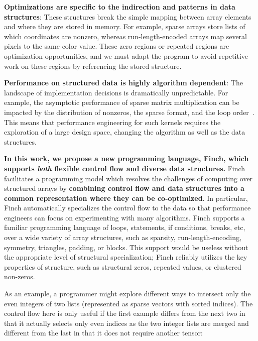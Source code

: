 \textbf{Optimizations are specific to the indirection and patterns in data structures}: 
%
These structures break the simple mapping between array elements and where they are stored in memory.
%
For example, sparse arrays store lists of which coordinates are nonzero, whereas run-length-encoded arrays map several pixels to the same color value. 
%
These zero regions or repeated regions are optimization opportunities, and we must adapt the program to avoid repetitive work on these regions by referencing the stored structure.

\textbf{Performance on structured data is highly algorithm dependent}: The landscape of implementation decisions is dramatically unpredictable. 
%
For example, the asymptotic performance of sparse matrix multiplication can be impacted by the distribution of nonzeros, the sparse format, and the loop order~\cite{ahrens2022autoscheduling, zhang2021gamma}. 
This means that performance engineering for such kernels requires the exploration of a large design space, changing the algorithm as well as the data structures.



\textbf{In this work, we propose a new programming language, Finch, which supports \textit{both} flexible control flow and diverse data structures.}
%
Finch facilitates a programming model which resolves the challenges of computing over structured arrays by \textbf{combining control flow and data structures into a common representation where they can be co-optimized}.
%
In particular, Finch automatically specializes the control flow to the data so that performance engineers can focus on experimenting with many algorithms.
%
Finch supports a familiar programming language of loops, statements, if conditions, breaks, etc, over a wide variety of array structures, such as sparsity, run-length-encoding, symmetry, triangles, padding, or blocks. 
%
This support would be useless without the appropriate level of structural specialization; Finch reliably utilizes the key properties of structure, such as structural zeros, repeated values, or clustered non-zeros.
%

As an example, a programmer might explore different ways to intersect only the even integers of two lists (represented as sparse vectors with sorted indices). The control flow here is only useful if the first example differs from the next two in that it actually selects only even indices as the two integer lists are merged and different from the last in that it does not require another tensor:

